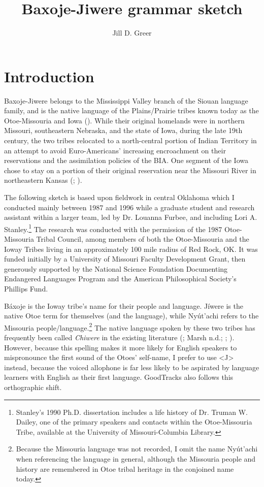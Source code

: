 \documentclass[output=paper]{LSP/langsci}
\author{Jill D. Greer}
\title{Baxoje-Jiwere grammar sketch }
\begin{document}
\section{Introduction}

Baxoje-Jiwere belongs to the Mississippi Valley branch of the Siouan language family, and is the native language of the Plains/Prairie tribes known today as the Otoe-Missouria and Iowa (\citealt[3,8]{Goddard1996}).  While their original homelands were in northern Missouri, southeastern Nebraska, and the state of Iowa, during the late 19th century, the two tribes relocated to a north-central portion of Indian Territory in an attempt to avoid Euro-Americans' increasing encroachment on their reservations and the assimilation policies of the BIA.  One segment of the Iowa chose to stay on a portion of their original reservation near the Missouri River in northeastern Kansas (\citealt{Wedel2001}; \citealt{Schweitzer2001}).  

The following sketch is based upon fieldwork in central Oklahoma which I conducted mainly between 1987 and 1996 while a graduate student and research assistant within a larger team, led by Dr. Louanna Furbee, and including Lori A. Stanley.\footnote{Stanley's 1990 Ph.D. dissertation includes a life history of Dr. Truman W. Dailey, one of the primary speakers and contacts within the Otoe-Missouria Tribe, available at the University of Missouri-Columbia Library.} The research was conducted with the permission of the 1987 Otoe-Missouria Tribal Council, among members of both the Otoe-Missouria and the Ioway Tribes living in an approximately 100 mile radius of Red Rock, OK.  It was funded initially by a University of Missouri Faculty Development Grant, then generously supported by the National Science Foundation Documenting Endangered Languages Program and the American Philosophical Society's Phillips Fund.

Báxoje is the Ioway tribe's name for their people and language.  J\'iwere is the native Otoe term for themselves (and the language), while Nyút'achi refers to the Missouria people/language.\footnote{Because the Missouria language was not recorded, I omit the name Nyút'achi  when referencing the language in general, although the Missouria people and history are remembered in Otoe tribal heritage in the conjoined name today.} The native language spoken by these two tribes has frequently been called \textit{Chiwere} in the existing literature (\citealt{Whitman1947}; Marsh n.d.; \citealt{Wedel2001}; \citealt{Schweitzer2001}).  However, because this spelling makes it more likely for English speakers to mispronounce the first sound of the Otoes' self-name, I prefer to use <J> instead, because the voiced allophone is far less likely to be aspirated by language learners with English as their first language.  GoodTracks also follows this orthographic shift.  
\end{document}
